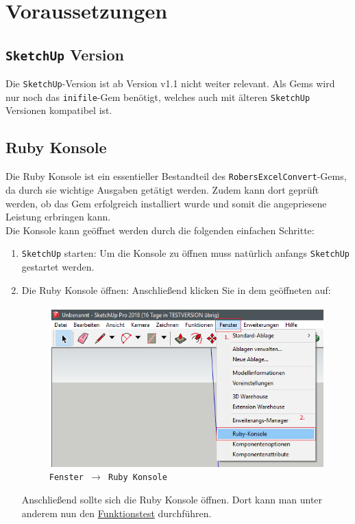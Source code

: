 \documentclass{book}
\newcommand{\sketchup}{\texttt{SketchUp}\xspace}
\newcommand{\inifile}{\texttt{inifile}\xspace}
\newcommand{\robersexcelconvert}{\texttt{RobersExcelConvert}\xspace}
\begin{document}
	\chapter{Voraussetzungen}
		\section{\sketchup Version} \label{sketchup version}
			Die \sketchup-Version ist ab Version v1.1 nicht weiter relevant. Als Gems wird nur noch das \inifile-Gem benötigt, welches auch mit älteren \sketchup Versionen kompatibel ist.
		\section{Ruby Konsole} \label{Ruby Konsole}
			Die Ruby Konsole ist ein essentieller Bestandteil des \robersexcelconvert-Gems, da durch sie wichtige Ausgaben getätigt werden. Zudem kann dort geprüft werden, ob das Gem erfolgreich installiert wurde und somit die angepriesene Leistung erbringen kann.\\
			Die Konsole kann geöffnet werden durch die folgenden einfachen Schritte:
				\begin{enumerate}
					\item \sketchup starten:
						Um die Konsole zu öffnen muss natürlich anfangs \sketchup gestartet werden.
					\item Die Ruby Konsole öffnen:
						Anschließend klicken Sie in dem geöffneten auf:
						\begin{figure}[H]
							\centering
							\includegraphics[scale=0.6]{pics/Ruby-Konsole-oeffnen.png}\\
							\texttt{Fenster $\rightarrow$ Ruby Konsole}							
						\end{figure}
						Anschließend sollte sich die Ruby Konsole öffnen. Dort kann man unter anderem nun den \hyperref[Funktionstest]{Funktionstest} durchführen.
				\end{enumerate}
\end{document}
